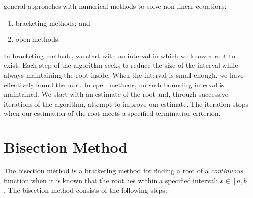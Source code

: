  general approaches with numerical methods to solve non-linear equations:
\begin{enumerate}
\item bracketing methods; and
\item open methods.
\end{enumerate}
In bracketing methods, we start with an interval in which we know a root to exist.  Each step of the algorithm seeks to reduce the size of the interval while always maintaining the root inside.  When the interval is small enough, we have effectively found the root.  In open methods, no such bounding interval is maintained.  We start with an estimate of the root and, through successive iterations of the algorithm, attempt to improve our estimate.  The iteration stops when our estimation of the root meets a specified termination criterion.  

\section{Bisection Method}
The bisection method is a bracketing method for finding a root of a \emph{continuous} function when it is known that the root lies within a specified interval: $x \in [a,b]$.  The bisection method consists of the following steps:

